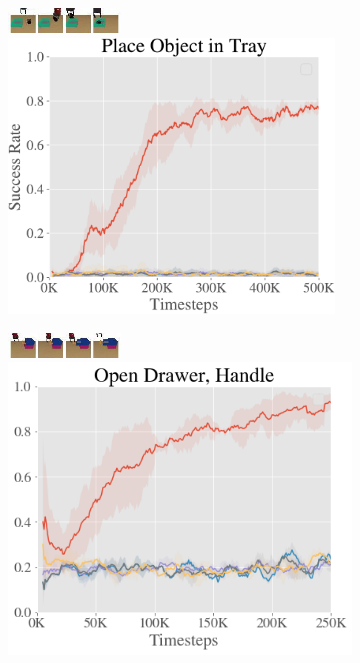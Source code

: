 \begin{figure}[t]
    \centering
    \begin{subfigure}[b]{0.222\textwidth}
        \center
        \includegraphics[width=3cm]{val/imgs/comparison_data/filmstrip_tray.jpeg}
        
        \vspace{0.1cm}
        \includegraphics[width=0.95\textwidth]{val/imgs/comparison_data_new/plt4-crop.pdf}
    \end{subfigure}
    \begin{subfigure}[b]{0.21\textwidth}
        \center
        \includegraphics[width=3cm]{val/imgs/comparison_data/filmstrip_top.jpeg}
        
        \vspace{0.1cm}
        \includegraphics[width=1\textwidth]{val/imgs/comparison_data_new/fixed_handle.png}


\end{subfigure}
\end{figure}
